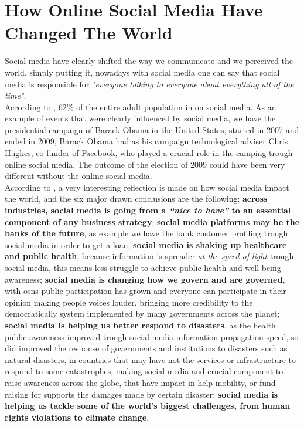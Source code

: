 \section{How Online Social Media Have Changed The World}

Social media have clearly shifted the way we communicate and we perceived the world, simply putting it, nowadays with social media one can say that social media is responsible for \textit{"everyone talking to everyone about everything all of the time"}.\\
\indent According to \cite{demogsmu}, 62\% of the entire adult population in on social media. As an example of events that were clearly influenced by social media, we have the presidential campaign of Barack Obama in the United States, started in 2007 and ended in 2009, Barack Obama had as his campaign technological adviser Chris Hughes, co-funder of Facebook, who played a crucial role in the camping trough online social media. The outcome of the election of 2009 could have been very different without the online social media.\\
\indent According to \cite{6wayschange}, a very interesting reflection is made on how social media impact the world, and the six major drawn conclusions are the following: \textbf{across industries, social media is going from a \textit{“nice to have”} to an essential component of any business strategy}; \textbf{social media platforms may be the banks of the future}, as example we have the bank customer profiling trough social media in order to get a loan; \textbf{social media is shaking up healthcare and public health}, because information is spreader \textit{at the speed of light} trough social media, this means less struggle to achieve public health and well being awareness; \textbf{social media is changing how we govern and are governed}, with \glspl{osn} public participation has grown and everyone can participate in their opinion making people voices louder, bringing more credibility to the democratically system implemented by many governments across the planet; \textbf{social media is helping us better respond to disasters}, as the health public awareness improved trough social media information propagation speed, so did improved the response of governments and institutions to disasters such as natural disasters, in countries that may have not the services or infrastructure to respond to some catastrophes, making social media and crucial component to raise awareness across the globe, that have impact in help mobility, or fund raising for supports the damages made by certain disaster; \textbf{social media is helping us tackle some of the world’s biggest challenges, from human rights violations to climate change}.\\
